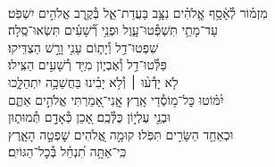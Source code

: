 \documentclass[twoside, openany, parskip=half, 11pt]{book}
\begin{document}
{\enlargethispage{\baselineskip}

\\
\vspace{-1.5\baselineskip}
\begin{narrow}
%
מִזְמ֗וֹר לְ֯אָ֫סָ֥ף \hfill \break
אֱֽלֹהִ֗ים נִצָּ֥ב בַּעֲדַת־אֵ֑ל \hfill בְּ֯קֶ֖רֶב אֱלֹהִ֣ים יִשְׁפֹּֽט׃ \\
עַד־מָתַ֥י תִּשְׁפְּ֯טוּ־עָ֑וֶל \hfill וּפְנֵ֥י רְ֯֝שָׁעִ֗ים תִּשְׂאוּ־סֶֽלָה׃ \\
שִׁפְטוּ־דַ֥ל וְ֯יָת֑וֹם \hfill עָנִ֖י וָרָ֣שׁ הַצְדִּֽיקוּ׃ \\
פַּלְּ֯טוּ־דַ֥ל וְ֯אֶבְי֑וֹן \hfill מִיַּ֖ד רְ֯שָׁעִ֣ים הַצִּֽילוּ׃ \\
לֹ֤א יָדְ֯ע֨וּ ׀ וְ֯לֹ֥א יָבִ֗ינוּ \hfill בַּחֲשֵׁכָ֥ה יִתְהַלָּ֑כוּ \\ יִ֝מּ֗וֹטוּ כׇּל־מ֥וֹסְ֯דֵי אָֽרֶץ׃ \hfill
אֲֽנִי־אָ֭מַרְתִּי אֱלֹהִ֣ים אַתֶּ֑ם \\ וּבְנֵ֖י עֶלְי֣וֹן כֻּלְּ֯כֶֽם׃ \hfill
אָ֭כֵן כְּ֯אָדָ֣ם תְּ֯מוּת֑וּן \\ וּכְאַחַ֖ד הַשָּׂרִ֣ים תִּפֹּֽלוּ׃ \hfill
קוּמָ֣ה אֱ֭לֹהִים שׇׁפְטָ֣ה הָאָ֑רֶץ \\ כִּֽי־אַתָּ֥ה תִ֝נְחַ֗ל בְּ֯כׇל־הַגּוֹיִֽם׃ \hfill \break
\end{narrow}


}
\end{document}
